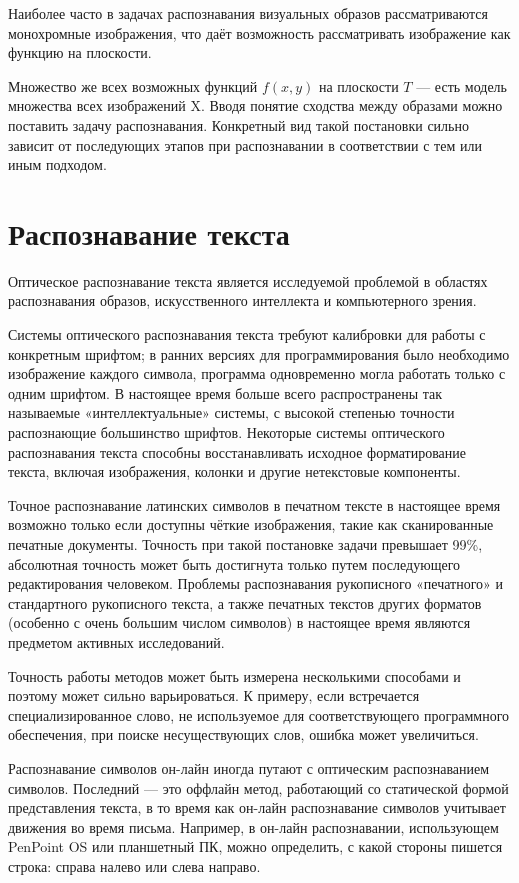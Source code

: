 Наиболее часто в задачах распознавания визуальных образов рассматриваются монохромные изображения, что даёт возможность рассматривать изображение как функцию на плоскости.

Множество же всех возможных функций $f(x, y)$ на плоскости $T$ — есть модель множества всех изображений X. Вводя понятие сходства между образами можно поставить задачу распознавания. Конкретный вид такой постановки сильно зависит от последующих этапов при распознавании в соответствии с тем или иным подходом.

\section{Распознавание текста}
Оптическое распознавание текста является исследуемой проблемой в областях распознавания образов, искусственного интеллекта и компьютерного зрения.

Системы оптического распознавания текста требуют калибровки для работы с конкретным шрифтом; в ранних версиях для программирования было необходимо изображение каждого символа, программа одновременно могла работать только с одним шрифтом. В настоящее время больше всего распространены так называемые «интеллектуальные» системы, с высокой степенью точности распознающие большинство шрифтов. Некоторые системы оптического распознавания текста способны восстанавливать исходное форматирование текста, включая изображения, колонки и другие нетекстовые компоненты.

Точное распознавание латинских символов в печатном тексте в настоящее время возможно только если доступны чёткие изображения, такие как сканированные печатные документы. Точность при такой постановке задачи превышает 99\%, абсолютная точность может быть достигнута только путем последующего редактирования человеком. Проблемы распознавания рукописного «печатного» и стандартного рукописного текста, а также печатных текстов других форматов (особенно с очень большим числом символов) в настоящее время являются предметом активных исследований.

Точность работы методов может быть измерена несколькими способами и поэтому может сильно варьироваться. К примеру, если встречается специализированное слово, не используемое для соответствующего программного обеспечения, при поиске несуществующих слов, ошибка может увеличиться.

Распознавание символов он-лайн иногда путают с оптическим распознаванием символов. Последний — это оффлайн метод, работающий со статической формой представления текста, в то время как он-лайн распознавание символов учитывает движения во время письма. Например, в он-лайн распознавании, использующем PenPoint OS или планшетный ПК, можно определить, с какой стороны пишется строка: справа налево или слева направо.

